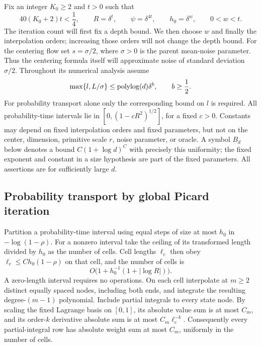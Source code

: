 Fix an integer $K_0\ge2$ and $t>0$ such that
\begin{equation}\label{eq:numerical-parameters}
 40(K_0+2)t<\frac14,\qquad
 R=\delta^t,\qquad \psi=\delta^{4t},\qquad h_0=\delta^w,\qquad 0<w<t.
\end{equation}
The iteration count will first fix a depth bound.  We then choose $w$
and finally the interpolation orders; increasing those orders will not
change the depth bound.  For the centering flow set $s=\sigma/2$, where
$\sigma>0$ is the parent mean-noise parameter.  Thus the centering
formula itself will approximate noise of standard deviation $\sigma/2$.
Throughout its numerical analysis assume
\begin{equation}\label{eq:numerical-size}
 \max\{l,L/\sigma\}\le\operatorname{polylog}(d)\delta^b,\qquad b\ge\frac12.
\end{equation}
For probability transport alone only the corresponding bound on $l$ is
required.  All probability-time intervals lie in
$[0,(1-cR^2)^{1/2}]$, for a fixed $c>0$.  Constants may depend on fixed
interpolation orders and fixed parameters, but not on the center,
dimension, primitive scale $r$, noise parameter, or oracle.  A symbol
$B_d$ below denotes a bound $C(1+\log d)^C$ with precisely this uniformity;
the fixed exponent and constant in a size hypothesis are part of the
fixed parameters.  All assertions are for sufficiently large $d$.

\subsection{Probability transport by global Picard iteration}

Partition a probability-time interval using equal steps of size at most
$h_0$ in $-\log(1-\rho)$.  For a nonzero interval take the ceiling of
its transformed length divided by $h_0$ as the number of cells.
Cell lengths $\ell_c$ then obey
$\ell_c\le C h_0(1-\rho)$ on that cell, and the number of cells is
\[
 O\bigl(1+h_0^{-1}(1+|\log R|)\bigr).
\]
A zero-length interval requires no operations.  On each cell interpolate
at $m\ge2$ distinct equally spaced nodes, including both ends, and
integrate the resulting degree-$(m-1)$ polynomial.  Include partial
integrals to every state node.  By scaling the fixed Lagrange basis on
$[0,1]$, its absolute value sum is at most $C_m$, and its order-$k$
derivative absolute sum is at most $C_m\ell_c^{-k}$.
Consequently every partial-integral row has absolute weight sum at most
$C_m$, uniformly in the number of cells.

